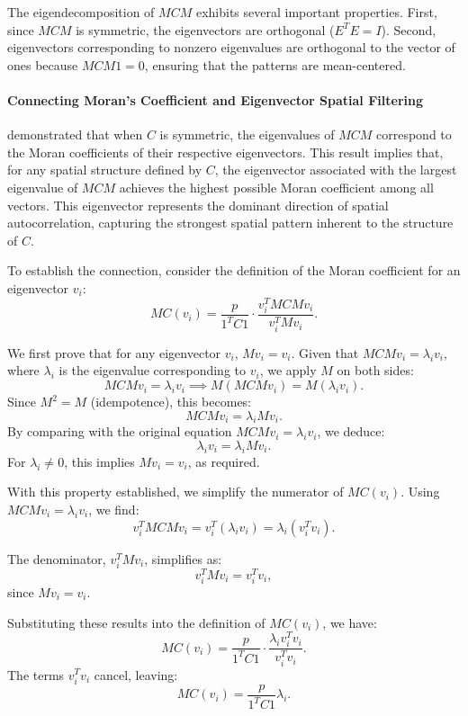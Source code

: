 \documentclass[12pt]{article}
\begin{document}
The eigendecomposition of \( M C M \) exhibits several important properties. First, since \( MCM \) is symmetric, the eigenvectors are orthogonal (\( E^T E = I \)). Second, eigenvectors corresponding to nonzero eigenvalues are orthogonal to the vector of ones because \( MCM 1 = 0 \), ensuring that the patterns are mean-centered.


\paragraph{Connecting Moran's Coefficient and Eigenvector Spatial Filtering}

\citet{de1984extreme} demonstrated that when \( C \) is symmetric, the eigenvalues of \( MCM \) correspond to the Moran coefficients of their respective eigenvectors. This result implies that, for any spatial structure defined by \( C \), the eigenvector associated with the largest eigenvalue of \( MCM \) achieves the highest possible Moran coefficient among all vectors. This eigenvector represents the dominant direction of spatial autocorrelation, capturing the strongest spatial pattern inherent to the structure of \( C \).

To establish the connection, consider the definition of the Moran coefficient for an eigenvector \( v_i \):
\[
  MC(v_i) = \frac{p}{1^T C 1} \cdot \frac{v_i^T MCM v_i}{v_i^T M v_i}.
\]

We first prove that for any eigenvector \( v_i \), \( M v_i = v_i \). Given that \( MCM v_i = \lambda_i v_i \), where \( \lambda_i \) is the eigenvalue corresponding to \( v_i \), we apply \( M \) on both sides:
\[
  MCM v_i = \lambda_i v_i \implies M(MCM v_i) = M(\lambda_i v_i).
\]
Since \( M^2 = M \) (idempotence), this becomes:
\[
  MCM v_i = \lambda_i M v_i.
\]
By comparing with the original equation \( MCM v_i = \lambda_i v_i \), we deduce:
\[
  \lambda_i v_i = \lambda_i M v_i.
\]
For \( \lambda_i \neq 0 \), this implies \( M v_i = v_i \), as required.

With this property established, we simplify the numerator of \( MC(v_i) \). Using \( MCM v_i = \lambda_i v_i \), we find:
\[
  v_i^T MCM v_i = v_i^T (\lambda_i v_i) = \lambda_i (v_i^T v_i).
\]

The denominator, \( v_i^T M v_i \), simplifies as:
\[
  v_i^T M v_i = v_i^T v_i,
\]
since \( M v_i = v_i \).

Substituting these results into the definition of \( MC(v_i) \), we have:
\[
  MC(v_i) = \frac{p}{1^T C 1} \cdot \frac{\lambda_i v_i^T v_i}{v_i^T v_i}.
\]
The terms \( v_i^T v_i \) cancel, leaving:
\[
  MC(v_i) = \frac{p}{1^T C 1} \lambda_i.
\]
\end{document}
